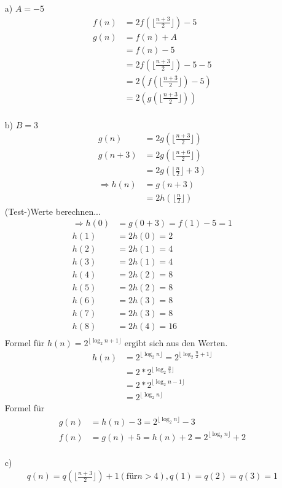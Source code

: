 \documentclass[ngerman,a4paper]{report}
\begin{document}
\begin{enumerate}
\item[a)] $A = -5$
\begin{align*}
f(n)&=2f(\lfloor \frac{n+3}{2}\rfloor)-5\\
g(n)&=f(n)+A\\
&=f(n)-5\\
&=2f(\lfloor \frac{n+3}{2}\rfloor)-5-5\\
&=2(f(\lfloor \frac{n+3}{2}\rfloor)-5)\\
&=2(g(\lfloor \frac{n+3}{2}\rfloor))\\
\end{align*}
\item[b)] $B = 3$
\begin{align*}
g(n)&=2g(\lfloor \frac{n+3}{2}\rfloor)\\
g(n+3)&=2g(\lfloor \frac{n+6}{2}\rfloor)\\
&=2g(\lfloor \frac{n}{2}\rfloor+3)\\
\Rightarrow h(n) &= g(n+3)\\
&= 2h(\lfloor \frac{n}{2}\rfloor)
\end{align*}
(Test-)Werte berechnen...
\begin{align*}
\Rightarrow h(0) &= g(0+3) = f(1) - 5 = 1\\
h(1) &= 2h(0) = 2\\
h(2) &= 2h(1) = 4\\
h(3) &= 2h(1) = 4\\
h(4) &= 2h(2) = 8\\
h(5) &= 2h(2) = 8\\
h(6) &= 2h(3) = 8\\
h(7) &= 2h(3) = 8\\
h(8) &= 2h(4) =16\\
\end{align*}
Formel für $h(n) = 2^{\lfloor \log_2 n+1 \rfloor}$ ergibt sich aus den Werten.\\
\begin{align*}
h(n) &= 2^{\lfloor \log_2 n \rfloor} = 2^{\lfloor \log_2 \frac{n}{2} +1\rfloor}\\
&= 2 * 2^{\lfloor \log_2 \frac{n}{2}\rfloor}\\
&= 2 * 2^{\lfloor \log_2 n-1\rfloor}\\
&= 2^{\lfloor \log_2 n\rfloor}
\end{align*}
Formel für
\begin{align*}
g(n) &= h(n)-3 = 2^{\lfloor \log_2 n\rfloor}-3\\
f(n) &= g(n)+5 = h(n) + 2 = 2^{\lfloor \log_2 n\rfloor} + 2\\
\end{align*}
\item[c)] \begin{align*}
q(n) = q (\lfloor \frac{n+3}{2} \rfloor) +1 (\text{für} n > 4), q(1) = q(2) = q (3) = 1
\end{align*}
\end{enumerate}
\end{document}
